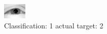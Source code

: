 \begin{figure}[h!]
\begin{center}
\includegraphics[width=0.60\columnwidth]{figures/ID2251_class_1_target_2.png}
\end{center}
\caption{ Classification: 1 actual target: 2}
\label{fig:ID2251_class_1_target_2}
\end{figure}

